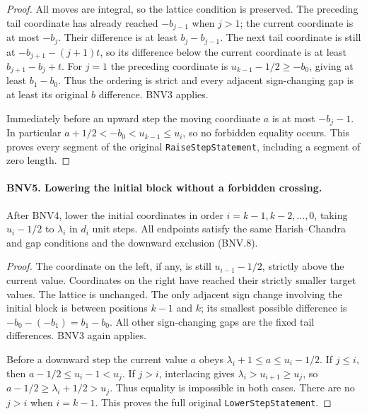 \documentclass[11pt,a4paper]{article}
\numberwithin{equation}{section}
\theoremstyle{remark}\newtheorem{remark}[theorem]{Remark}
\begin{document}
\begin{proof}
All moves are integral, so the lattice condition is preserved.  The
preceding tail coordinate has already reached $-b_{j-1}$ when $j>1$;
the current coordinate is at most $-b_j$.  Their difference is at least
$b_j-b_{j-1}$.  The next tail coordinate is still at
$-b_{j+1}-(j+1)t$, so its difference below the current coordinate is at
least $b_{j+1}-b_j+t$.  For $j=1$ the preceding coordinate is
$u_{k-1}-1/2\ge-b_0$, giving at least $b_1-b_0$.  Thus the ordering
is strict and every adjacent sign-changing gap is at least its original
$b$ difference.  BNV3 applies.

Immediately before an upward step the moving coordinate $a$ is at most
$-b_j-1$.  In particular $a+1/2<-b_0<u_{k-1}\le u_i$, so no forbidden
equality occurs.  This proves every segment of the original
\texttt{Raise\allowbreak Step\allowbreak Statement}, including a segment of zero length.
\end{proof}

\paragraph{BNV5. Lowering the initial block without a forbidden crossing.}
\label{claim:BNV5}
After BNV4, lower the initial coordinates in order
$i=k-1,k-2,\ldots,0$, taking $u_i-1/2$ to $\lambda_i$ in $d_i$ unit
steps.  All endpoints satisfy the same Harish--Chandra and gap conditions
and the downward exclusion (BNV.8).

\begin{proof}
The coordinate on the left, if any, is still $u_{i-1}-1/2$, strictly
above the current value.  Coordinates on the right have reached their
strictly smaller target values.  The lattice is unchanged.  The only
adjacent sign change involving the initial block is between positions
$k-1$ and $k$; its smallest possible difference is
$-b_0-(-b_1)=b_1-b_0$.  All other sign-changing gaps are the fixed tail
differences.  BNV3 again applies.

Before a downward step the current value $a$ obeys
$\lambda_i+1\le a\le u_i-1/2$.  If $j\le i$, then
$a-1/2\le u_i-1<u_j$.  If $j>i$, interlacing gives
$\lambda_i>u_{i+1}\ge u_j$, so
$a-1/2\ge\lambda_i+1/2>u_j$.  Thus equality is impossible in both
cases.  There are no $j>i$ when $i=k-1$.  This proves the full original
\texttt{Lower\allowbreak Step\allowbreak Statement}.
\end{proof}
\end{document}
